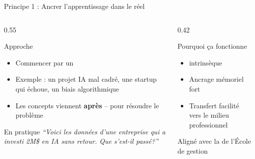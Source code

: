 \documentclass[aspectratio=169,11pt]{beamer}
\begin{document}
\begin{frame}{Principe 1 : Ancrer l'apprentissage dans le réel}
  \begin{columns}[T]
    \begin{column}{0.55\textwidth}
      \begin{block}{Approche}
        \begin{itemize}
          \item Commencer par un 
          \item Exemple : un projet IA mal cadré, une startup qui échoue, un biais algorithmique
          \item Les concepts viennent \textbf{après} -- pour résoudre le problème
        \end{itemize}
      \end{block}
      
      \vspace{0.3em}
      
      \begin{exampleblock}{En pratique}
        \small
        \textit{``Voici les données d'une entreprise qui a investi 2M\$ en IA sans retour. Que s'est-il passé?''}
      \end{exampleblock}
    \end{column}
    \begin{column}{0.42\textwidth}
      \begin{alertblock}{Pourquoi ça fonctionne}
        \begin{itemize}
          \item {} intrinsèque
          \item Ancrage mémoriel fort
          \item Transfert facilité vers le milieu professionnel
        \end{itemize}
      \end{alertblock}
      
      \vspace{0.3em}
      
      {\small Aligné avec la  de l'École de gestion}
    \end{column}
  \end{columns}
\end{frame}
\end{document}
